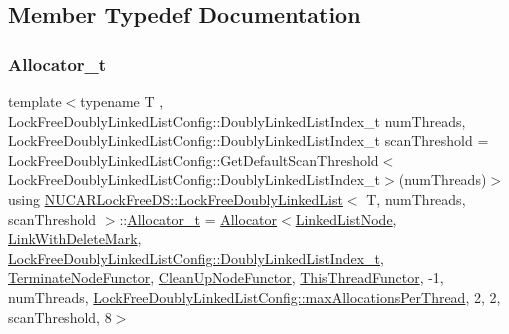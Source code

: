 \subsection{Member Typedef Documentation}
\mbox{\label{class_n_u_c_a_r_lock_free_d_s_1_1_lock_free_doubly_linked_list_af534991f4eb0641191f936a80c701e6c}} 
\subsubsection{\texorpdfstring{Allocator\+\_\+t}{Allocator\_t}}
{\footnotesize\ttfamily template$<$typename T , Lock\+Free\+Doubly\+Linked\+List\+Config\+::\+Doubly\+Linked\+List\+Index\+\_\+t num\+Threads, Lock\+Free\+Doubly\+Linked\+List\+Config\+::\+Doubly\+Linked\+List\+Index\+\_\+t scan\+Threshold = Lock\+Free\+Doubly\+Linked\+List\+Config\+::\+Get\+Default\+Scan\+Threshold$<$\+Lock\+Free\+Doubly\+Linked\+List\+Config\+::\+Doubly\+Linked\+List\+Index\+\_\+t$>$(num\+Threads)$>$ \\
using \mbox{\hyperlink{class_n_u_c_a_r_lock_free_d_s_1_1_lock_free_doubly_linked_list}{N\+U\+C\+A\+R\+Lock\+Free\+D\+S\+::\+Lock\+Free\+Doubly\+Linked\+List}}$<$ T, num\+Threads, scan\+Threshold $>$\+::\mbox{\hyperlink{class_n_u_c_a_r_lock_free_d_s_1_1_lock_free_doubly_linked_list_af534991f4eb0641191f936a80c701e6c}{Allocator\+\_\+t}} =  \mbox{\hyperlink{class_n_u_c_a_r_lock_free_d_s_1_1_allocator}{Allocator}}$<$\mbox{\hyperlink{class_n_u_c_a_r_lock_free_d_s_1_1_lock_free_doubly_linked_list_1_1_linked_list_node}{Linked\+List\+Node}}, \mbox{\hyperlink{class_n_u_c_a_r_lock_free_d_s_1_1_lock_free_doubly_linked_list_1_1_link_with_delete_mark}{Link\+With\+Delete\+Mark}}, \mbox{\hyperlink{namespace_n_u_c_a_r_lock_free_d_s_1_1_lock_free_doubly_linked_list_config_ad084f1e0e5259e450dbbbd2f7cfdb979}{Lock\+Free\+Doubly\+Linked\+List\+Config\+::\+Doubly\+Linked\+List\+Index\+\_\+t}}, \mbox{\hyperlink{class_n_u_c_a_r_lock_free_d_s_1_1_lock_free_doubly_linked_list_1_1_terminate_node_functor}{Terminate\+Node\+Functor}}, \mbox{\hyperlink{class_n_u_c_a_r_lock_free_d_s_1_1_lock_free_doubly_linked_list_1_1_clean_up_node_functor}{Clean\+Up\+Node\+Functor}}, \mbox{\hyperlink{class_n_u_c_a_r_lock_free_d_s_1_1_lock_free_doubly_linked_list_1_1_this_thread_functor}{This\+Thread\+Functor}}, -\/1, num\+Threads, \mbox{\hyperlink{namespace_n_u_c_a_r_lock_free_d_s_1_1_lock_free_doubly_linked_list_config_a0dfa8a093d372cc44eb9a2eba65c5ab6}{Lock\+Free\+Doubly\+Linked\+List\+Config\+::max\+Allocations\+Per\+Thread}}, 2, 2, scan\+Threshold, 8$>$\hspace{0.3cm}{\ttfamily [private]}}

